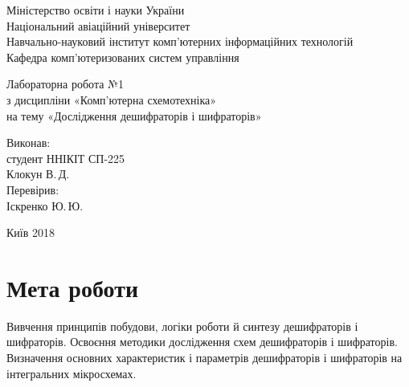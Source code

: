 \documentclass[a4paper,oneside,DIV=12,12pt,headings=normal]{scrartcl}
\newcommand{\allcaps}[1]{{\addfontfeatures{LetterSpace = 3}#1}}
\begin{document}
	\begin{titlepage}
	\centering
		Міністерство освіти і науки України\\
		Національний авіаційний університет\\
		Навчально-науковий інститут комп'ютерних інформаційних технологій\\
		Кафедра комп'ютеризованих систем управління

		\vspace*{\fill}

		Лабораторна робота №1\\
		з дисципліни «Комп'ютерна схемотехніка»\\
		на тему «Дослідження дешифраторів і шифраторів»

		\vspace*{\fill}
		
		\begin{flushright}
			Виконав:\\
			студент ННІКІТ СП-225\\
			Клокун В.\,Д.\\
			Перевірив:\\
			Іскренко Ю.\,Ю.
		\end{flushright}

		Київ 2018
    \end{titlepage}
	
	\section{Мета роботи}
		
		Вивчення принципів побудови, логіки роботи й синтезу дешифраторів і шифраторів. Освоєння методики дослідження схем дешифраторів і шифраторів. Визначення основних характеристик і параметрів дешифраторів і шифраторів на інтегральних мікросхемах.
			
\end{document}
